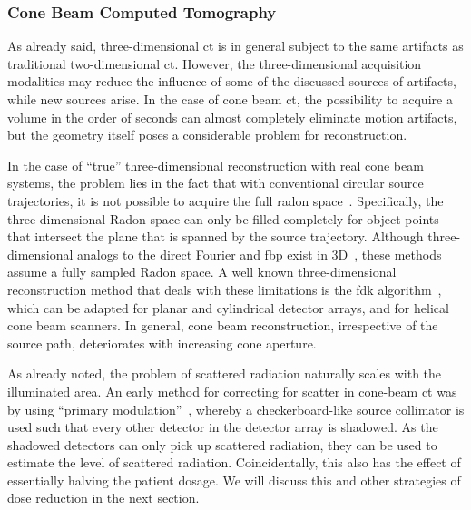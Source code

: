 \documentclass[../ml-ct.tex]{subfiles}
\begin{document}
\subsubsection{Cone Beam Computed Tomography}
As already said, three-dimensional \gls{ct} is in general subject to the same artifacts as traditional two-dimensional \gls{ct}.
However, the three-dimensional acquisition modalities may reduce the influence of some of the discussed sources of artifacts, while new sources arise.
In the case of cone beam \gls{ct}, the possibility to acquire a volume in the order of seconds can almost completely eliminate motion artifacts, but the geometry itself poses a considerable problem for reconstruction.

In the case of \enquote{true} three-dimensional reconstruction with real cone beam systems, the problem lies in the fact that with conventional circular source trajectories, it is not possible to acquire the full radon space~\cite{buzug_computed_2008}.
Specifically, the three-dimensional Radon space can only be filled completely for object points that intersect the plane that is spanned by the source trajectory.
Although three-dimensional analogs to the direct Fourier and \gls{fbp} exist in 3D~\cite{defrise_cone_1994,grangeat_mathematical_1991,kudo_derivation_1994}, these methods assume a fully sampled Radon space.
A well known three-dimensional reconstruction method that deals with these limitations is the \gls{fdk} algorithm~\cite{feldkamp_practical_1984}, which can be adapted for planar and cylindrical detector arrays, and for helical cone beam scanners.
In general, cone beam reconstruction, irrespective of the source path, deteriorates with increasing cone aperture.

As already noted, the problem of scattered radiation naturally scales with the illuminated area.
An early method for correcting for scatter in cone-beam \gls{ct} was by using \enquote{primary modulation}~\cite{zhu_scatter_2006}, whereby a checkerboard-like source collimator is used such that every other detector in the detector array is shadowed.
As the shadowed detectors can only pick up scattered radiation, they can be used to estimate the level of scattered radiation.
Coincidentally, this also has the effect of essentially halving the patient dosage.
We will discuss this and other strategies of dose reduction in the next section.
\end{document}
